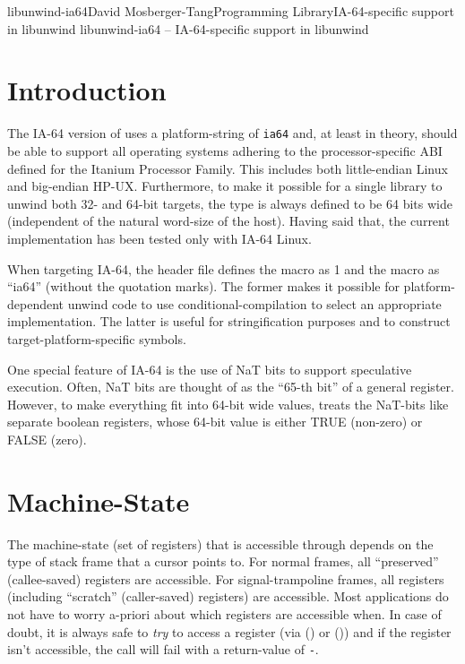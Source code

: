 \documentclass{article}
\begin{document}
\begin{Name}{3}{libunwind-ia64}{David Mosberger-Tang}{Programming Library}{IA-64-specific support in libunwind}
  libunwind-ia64 -- IA-64-specific support in libunwind
\end{Name}


\section{Introduction}

The IA-64 version of  uses a platform-string of
\texttt{ia64} and, at least in theory, should be able to support all
operating systems adhering to the processor-specific ABI defined for
the Itanium Processor Family.  This includes both little-endian Linux
and big-endian HP-UX.  Furthermore, to make it possible for a single
library to unwind both 32- and 64-bit targets, the type
 is always defined to be 64 bits wide (independent
of the natural word-size of the host).  Having said that, the current
implementation has been tested only with IA-64 Linux.

When targeting IA-64, the  header file defines the
macro  as 1 and the macro 
as ``ia64'' (without the quotation marks).  The former makes it
possible for platform-dependent unwind code to use
conditional-compilation to select an appropriate implementation.  The
latter is useful for stringification purposes and to construct
target-platform-specific symbols.

One special feature of IA-64 is the use of NaT bits to support
speculative execution.  Often, NaT bits are thought of as the ``65-th
bit'' of a general register.  However, to make everything fit into
64-bit wide  values,  treats the
NaT-bits like separate boolean registers, whose 64-bit value is either
TRUE (non-zero) or FALSE (zero).


\section{Machine-State}

The machine-state (set of registers) that is accessible through
 depends on the type of stack frame that a cursor
points to.  For normal frames, all ``preserved'' (callee-saved)
registers are accessible.  For signal-trampoline frames, all registers
(including ``scratch'' (caller-saved) registers) are accessible.  Most
applications do not have to worry a-priori about which registers are
accessible when.  In case of doubt, it is always safe to \emph{try} to
access a register (via () or
()) and if the register isn't accessible, the
call will fail with a return-value of \texttt{-}.
\end{document}
